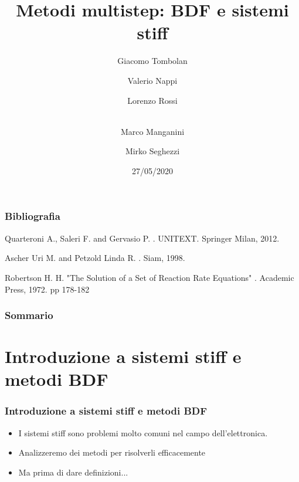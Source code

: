 \documentclass[aspectratio=169, 10pt, handout,usenames,dvipsnames]{beamer}
\title{Metodi multistep: BDF e sistemi stiff}
\date{27/05/2020}
\author{Giacomo Tombolan \and Valerio Nappi \and 
      Lorenzo Rossi \and  \\Marco Manganini \and
      Mirko Seghezzi}
\begin{document}
\begin{frame}
  \maketitle
\end{frame}


\begin{frame}


  \frametitle{Bibliografia}
  \begin{thebibliography}{99}\small
    
    Quarteroni A., Saleri F. and Gervasio P.
    .
    \newblock UNITEXT. Springer Milan, 2012.

    Ascher Uri M. and Petzold Linda R.
    .
    \newblock Siam, 1998.

    Robertson H. H. "The Solution of a Set of Reaction Rate Equations"
    .
    \newblock Academic Press, 1972. pp 178-182
  

   \end{thebibliography}

  
\end{frame}  




\begin{frame}
  \frametitle{Sommario}
  \tableofcontents
\end{frame}


\section{Introduzione a sistemi stiff e metodi BDF}\label{sec:sec1}
\begin{frame} \frametitle{Introduzione a sistemi stiff e metodi BDF}
    \begin{itemize}
        \item I sistemi stiff sono problemi molto comuni nel campo dell'elettronica. 
        \item Analizzeremo dei metodi per risolverli efficacemente
        \item Ma prima di dare definizioni...
    \end{itemize}
\end{frame}
\end{document}

